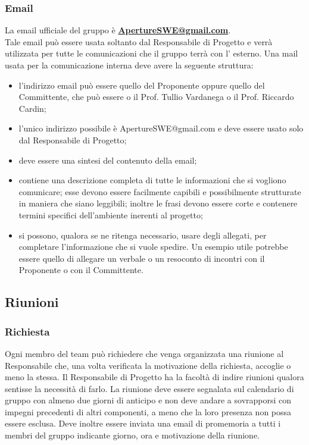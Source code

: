 \subsubsection{Email}
La email ufficiale del gruppo è \textbf{\url{ApertureSWE@gmail.com}}.\\
Tale email può essere usata soltanto dal Responsabile di Progetto e verrà utilizzata per tutte le comunicazioni che il gruppo terrà con l' esterno.
Una mail usata per la comunicazione interna deve avere la seguente struttura:
\begin{itemize}
\item {} l'indirizzo email può essere quello del Proponente oppure quello del Committente, che può essere o il Prof. Tullio Vardanega o il Prof. Riccardo Cardin;
\item {} l'unico indirizzo possibile è ApertureSWE@gmail.com e deve essere usato solo dal Responsabile di Progetto;
\item {} deve essere una sintesi del contenuto della email;
\item {} contiene una descrizione completa di tutte le informazioni che si vogliono comunicare; esse devono essere facilmente capibili e possibilmente strutturate in maniera che siano leggibili; inoltre le frasi devono essere corte e contenere termini specifici dell'ambiente  inerenti al progetto;
\item {} si possono, qualora se ne ritenga necessario, usare degli allegati, per completare l'informazione che si vuole spedire. Un esempio utile potrebbe essere quello di allegare un verbale o un resoconto di incontri con il Proponente  o con il Committente.
\end{itemize}


\subsection{Riunioni}
\label{3.3}

\subsubsection{Richiesta}
\label{3.3.1}
Ogni membro del team può richiedere che venga organizzata una riunione al Responsabile che, una volta verificata la motivazione della richiesta, accoglie o meno la stessa.
Il Responsabile di Progetto ha la facoltà di indire riunioni qualora sentisse la necessità di farlo.
La riunione deve essere segnalata sul calendario di gruppo con almeno due giorni di anticipo e non deve andare a sovrapporsi con impegni precedenti di altri componenti, a meno che la loro presenza non possa essere esclusa. Deve inoltre essere inviata una email di promemoria a tutti i membri del gruppo indicante giorno, ora e motivazione della riunione.

